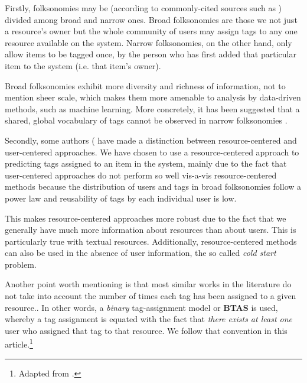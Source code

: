 Firstly, folksonomies may be (according to commonly-cited sources such as \cite{}) divided among broad and narrow ones. 
Broad folksonomies are those we not just a resource's owner but the whole community of users may assign tags to any one resource available on the system. Narrow folksonomies, on the other hand, only allow items to be tagged once, by the person who has first added that particular item to the system (i.e. that item's owner).

Broad folksonomies exhibit more diversity and richness of information, not to mention sheer scale, which makes them more amenable to analysis by data-driven methods, such as machine learning. More concretely, it has been suggested that a shared, global vocabulary of tags cannot be observed in narrow folksonomies \cite{schifanella_etal_2010}.

Secondly, some authors (\cite{illig_etal_2011,song_etal_2011} have made a distinction between resource-centered and user-centered approaches. We have chosen to use a resource-centered approach to predicting tags assigned to an item in the system, mainly due to the fact \citep{song_etal_2011} that user-centered approaches do not perform so well vis-a-vis resource-centered methods because the distribution of users and tags in broad folksonomies follow a power law and reusability of tags by each individual user is low. 

This makes resource-centered approaches more robust due to the fact that we generally have much more information about resources than about users. This is particularly true with textual resources. Additionally, resource-centered methods can also be used in the absence of user information, the so called \textit{cold start} problem.

Another point worth mentioning is that most similar works in the literature do not take into account the number of times each tag has been assigned to a given resource.. In other words, a \textit{binary} tag-assignment model or \textbf{BTAS} \citep{illig_etal_2011} is used, whereby a tag assignment is equated with the fact that \textit{there exists at least one} user who assigned that tag to that resource. We follow that convention in this article.\footnote{Adapted from \cite{illig_etal_2011}.}

